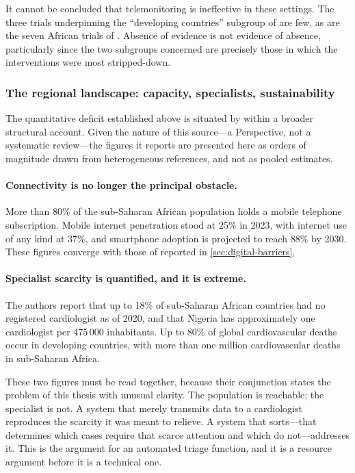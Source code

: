 \documentclass[12pt,a4paper,oneside]{report}
\begin{document}
It cannot be concluded that telemonitoring is ineffective in these settings. The three trials underpinning the ``developing countries'' subgroup of \textcite{mao2020} are few, as are the seven African trials of \textcite{aovare2023}. Absence of evidence is not evidence of absence, particularly since the two subgroups concerned are precisely those in which the interventions were most stripped-down.

\subsubsection{The regional landscape: capacity, specialists, sustainability}\label{sec:regional-landscape}

The quantitative deficit established above is situated by \textcite{segun2025} within a broader structural account. Given the nature of this source---a Perspective, not a systematic review---the figures it reports are presented here as orders of magnitude drawn from heterogeneous references, and not as pooled estimates.

\paragraph{Connectivity is no longer the principal obstacle.} More than 80\% of the sub-Saharan African population holds a mobile telephone subscription. Mobile internet penetration stood at 25\% in 2023, with internet use of any kind at 37\%, and smartphone adoption is projected to reach 88\% by 2030. These figures converge with those of \textcite{dodoo2022} reported in \cref{sec:digital-barriers}.

\paragraph{Specialist scarcity is quantified, and it is extreme.} The authors report that up to 18\% of sub-Saharan African countries had no registered cardiologist as of 2020, and that Nigeria has approximately one cardiologist per 475\,000 inhabitants. Up to 80\% of global cardiovascular deaths occur in developing countries, with more than one million cardiovascular deaths in sub-Saharan Africa.

These two figures must be read together, because their conjunction states the problem of this thesis with unusual clarity. The population is reachable; the specialist is not. A system that merely transmits data to a cardiologist reproduces the scarcity it was meant to relieve. A system that sorts---that determines which cases require that scarce attention and which do not---addresses it. This is the argument for an automated triage function, and it is a resource argument before it is a technical one.
\end{document}
